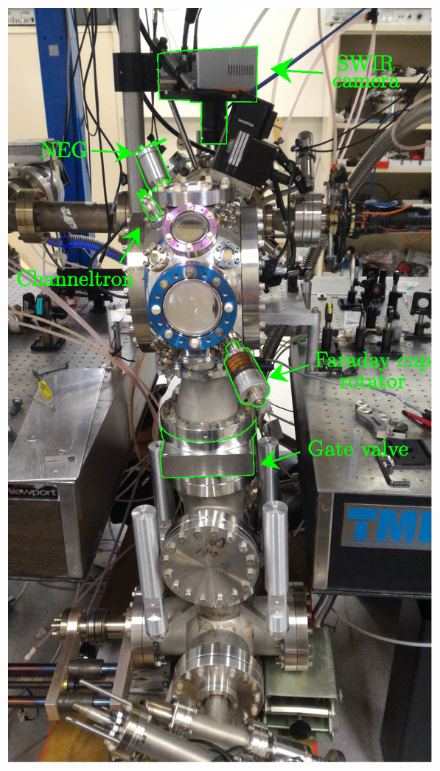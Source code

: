 \begin{figure}
\begin{minipage}{0.45\textwidth}
		\includegraphics[width=\textwidth]{fig/lattice/science_chamber_profile}  %
	  \end{minipage}
	\end{figure}


	
	
